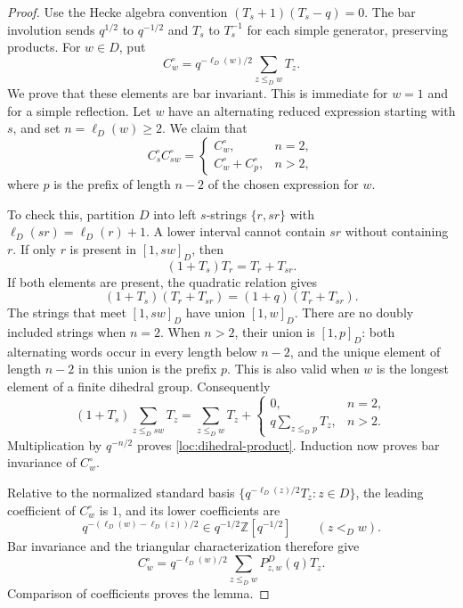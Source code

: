 \begin{proof}
Use the Hecke algebra convention
$(T_s+1)(T_s-q)=0$. The bar involution sends $q^{1/2}$ to $q^{-1/2}$
and $T_s$ to $T_s^{-1}$ for each simple generator, preserving products.
For $w\in D$, put
\[
  C_w^{\circ}=q^{-\ell_D(w)/2}\sum_{z\le_D w}T_z.
\]
We prove that these elements are bar invariant.  This is immediate for
$w=1$ and for a simple reflection.  Let $w$ have an alternating reduced
expression starting with $s$, and set $n=\ell_D(w)\ge2$.
We claim that
\begin{equation}
\label{loc:dihedral-product}
 C_s^{\circ}C_{sw}^{\circ}
 =
 \begin{cases}
  C_w^{\circ},&n=2,\\
  C_w^{\circ}+C_p^{\circ},&n>2,
 \end{cases}
\end{equation}
where $p$ is the prefix of length $n-2$ of the chosen expression for $w$.

To check this, partition $D$ into left $s$-strings $\{r,sr\}$ with
$\ell_D(sr)=\ell_D(r)+1$.  A lower interval cannot contain $sr$ without
containing $r$.  If only $r$ is present in $[1,sw]_D$, then
\[
 (1+T_s)T_r=T_r+T_{sr}.
\]
If both elements are present, the quadratic relation gives
\[
 (1+T_s)(T_r+T_{sr})=(1+q)(T_r+T_{sr}).
\]
The strings that meet $[1,sw]_D$ have union $[1,w]_D$.
There are no doubly included strings when $n=2$.  When $n>2$, their union
is $[1,p]_D$: both alternating words occur in every length below $n-2$,
and the unique element of length $n-2$ in this union is the prefix $p$.
This is also valid when $w$ is the longest element of a finite dihedral
group.  Consequently
\[
 (1+T_s)\sum_{z\le_D sw}T_z
 =\sum_{z\le_D w}T_z+
   \begin{cases}
    0,&n=2,\\
    q\displaystyle\sum_{z\le_D p}T_z,&n>2.
   \end{cases}
\]
Multiplication by $q^{-n/2}$ proves
\eqref{loc:dihedral-product}.  Induction now proves bar invariance of
$C_w^{\circ}$.

Relative to the normalized standard basis
$\{q^{-\ell_D(z)/2}T_z:z\in D\}$, the leading coefficient of
$C_w^{\circ}$ is $1$, and its lower coefficients are
\[
 q^{-(\ell_D(w)-\ell_D(z))/2}
 \in q^{-1/2}\mathbb Z[q^{-1/2}]
 \qquad(z<_D w).
\]
Bar invariance and the triangular characterization therefore give
\[
 C_w^{\circ}
 =q^{-\ell_D(w)/2}\sum_{z\le_D w}P^D_{z,w}(q)T_z.
\]
Comparison of coefficients proves the lemma.
\end{proof}

